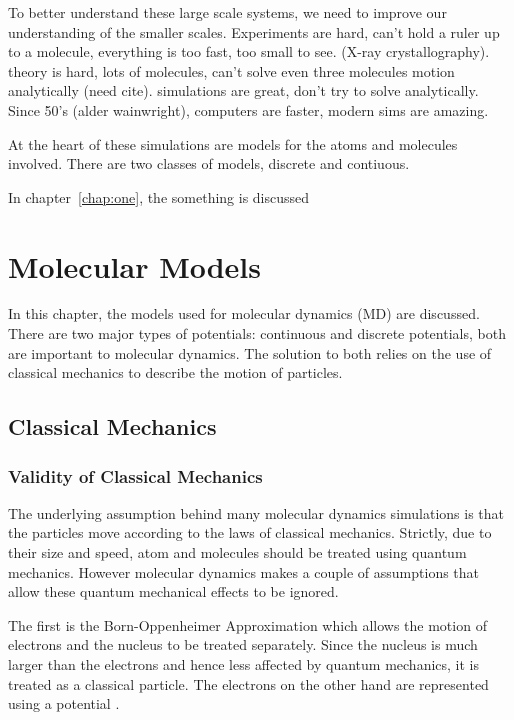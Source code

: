 \documentclass[12pt]{UoAthesis}
\begin{document}
To better understand these large scale systems, we need to improve our
understanding of the smaller scales. Experiments are hard, can't hold
a ruler up to a molecule, everything is too fast, too small to
see. (X-ray crystallography). theory is hard, lots of molecules, can't
solve even three molecules motion analytically (need
cite). simulations are great, don't try to solve analytically. Since
50's (alder wainwright), computers are faster, modern sims are
amazing.

At the heart of these simulations are models for the atoms and
molecules involved. There are two classes of models, discrete and
contiuous.

In chapter~\ref{chap:one}, the something is discussed

\chapter{Molecular Models}
In this chapter, the models used for molecular dynamics (MD)
 are discussed. There are two
major types of potentials: continuous and discrete potentials, both
are important to molecular dynamics. The solution to both relies on
the use of classical mechanics to describe the motion of particles.

\section{Classical Mechanics}

\subsection{Validity of Classical Mechanics}

The underlying assumption behind many molecular dynamics simulations
is that the particles move according to the laws of classical
mechanics. Strictly, due to their size and speed, atom and molecules
should be treated using quantum mechanics.  However molecular dynamics
makes a couple of assumptions that allow these quantum mechanical
effects to be ignored.  

The first is the Born-Oppenheimer Approximation which allows the
motion of electrons and the nucleus to be treated separately.  Since
the nucleus is much larger than the electrons and hence less affected
by quantum mechanics, it is treated as a classical particle.  The
electrons on the other hand are represented using a potential \cite{Jasper2006}.
\end{document}
